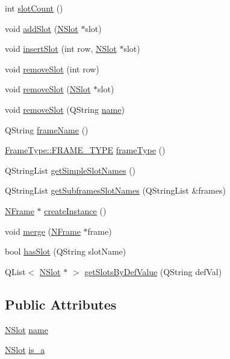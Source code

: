 \begin{DoxyCompactItemize}
\item 
int \hyperlink{class_n_frame_a771fffabeac61a18c6422fa5cc8e6c48}{slotCount} ()
\item 
void \hyperlink{class_n_frame_a6f8ed0d998e4b13c7a668bd896267482}{addSlot} (\hyperlink{class_n_slot}{NSlot} $\ast$slot)
\item 
void \hyperlink{class_n_frame_a55dbb8d0e9d60d04c28a8061e368ba2f}{insertSlot} (int row, \hyperlink{class_n_slot}{NSlot} $\ast$slot)
\item 
void \hyperlink{class_n_frame_a858dc943520e88ad3cc811233195ba6c}{removeSlot} (int row)
\item 
void \hyperlink{class_n_frame_abb492802326a743818658d9ace56bf9e}{removeSlot} (\hyperlink{class_n_slot}{NSlot} $\ast$slot)
\item 
void \hyperlink{class_n_frame_a11110a26d8d41bb5876b700606eefaad}{removeSlot} (QString \hyperlink{class_n_frame_aa88316dc74552f3997001ec6a67038e9}{name})
\item 
QString \hyperlink{class_n_frame_a8d7faa190ac75f35b13acd8a4345d338}{frameName} ()
\item 
\hyperlink{namespace_frame_type_aa380b02be71bbce421af299f6025b6a4}{FrameType::FRAME\_\-TYPE} \hyperlink{class_n_frame_a590a69163109a9ee5cec0897309940af}{frameType} ()
\item 
QStringList \hyperlink{class_n_frame_aa623f3a69f2abf36718b98bbebe192c9}{getSimpleSlotNames} ()
\item 
QStringList \hyperlink{class_n_frame_a2c3d76d45d801653d0d64a78a29588b7}{getSubframesSlotNames} (QStringList \&frames)
\item 
\hyperlink{class_n_frame}{NFrame} $\ast$ \hyperlink{class_n_frame_acf5a60187ef38186c11e7928c22afcb3}{createInstance} ()
\item 
void \hyperlink{class_n_frame_a42488d69004a8014ed8c334b4cedb2e6}{merge} (\hyperlink{class_n_frame}{NFrame} $\ast$frame)
\item 
bool \hyperlink{class_n_frame_a7daa0380d3758ed8fb6c6ca2bb74599a}{hasSlot} (QString slotName)
\item 
QList$<$ \hyperlink{class_n_slot}{NSlot} $\ast$ $>$ \hyperlink{class_n_frame_af31c191c0dd2171f4bf567b199583580}{getSlotsByDefValue} (QString defVal)
\end{DoxyCompactItemize}
\subsection*{Public Attributes}
\begin{DoxyCompactItemize}
\item 
\hyperlink{class_n_slot}{NSlot} \hyperlink{class_n_frame_aa88316dc74552f3997001ec6a67038e9}{name}
\item 
\hyperlink{class_n_slot}{NSlot} \hyperlink{class_n_frame_acc95dca714c4524344dbbdd3f27296a4}{is\_\-a}
\end{DoxyCompactItemize}



